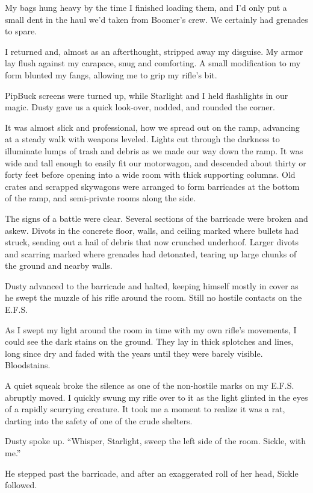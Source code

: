 My bags hung heavy by the time I finished loading them, and I’d only put a small dent in the haul we’d taken from Boomer’s crew. We certainly had grenades to spare.

I returned and, almost as an afterthought, stripped away my disguise. My armor lay flush against my carapace, snug and comforting. A small modification to my form blunted my fangs, allowing me to grip my rifle’s bit.

PipBuck screens were turned up, while Starlight and I held flashlights in our magic. Dusty gave us a quick look-over, nodded, and rounded the corner.

It was almost slick and professional, how we spread out on the ramp, advancing at a steady walk with weapons leveled. Lights cut through the darkness to illuminate lumps of trash and debris as we made our way down the ramp. It was wide and tall enough to easily fit our motorwagon, and descended about thirty or forty feet before opening into a wide room with thick supporting columns. Old crates and scrapped skywagons were arranged to form barricades at the bottom of the ramp, and semi-private rooms along the side.

The signs of a battle were clear. Several sections of the barricade were broken and askew. Divots in the concrete floor, walls, and ceiling marked where bullets had struck, sending out a hail of debris that now crunched underhoof. Larger divots and scarring marked where grenades had detonated, tearing up large chunks of the ground and nearby walls.

Dusty advanced to the barricade and halted, keeping himself mostly in cover as he swept the muzzle of his rifle around the room. Still no hostile contacts on the E.F.S.

As I swept my light around the room in time with my own rifle’s movements, I could see the dark stains on the ground. They lay in thick splotches and lines, long since dry and faded with the years until they were barely visible. Bloodstains.

A quiet squeak broke the silence as one of the non-hostile marks on my E.F.S. abruptly moved. I quickly swung my rifle over to it as the light glinted in the eyes of a rapidly scurrying creature. It took me a moment to realize it was a rat, darting into the safety of one of the crude shelters.

Dusty spoke up. “Whisper, Starlight, sweep the left side of the room. Sickle, with me.”

He stepped past the barricade, and after an exaggerated roll of her head, Sickle followed.

